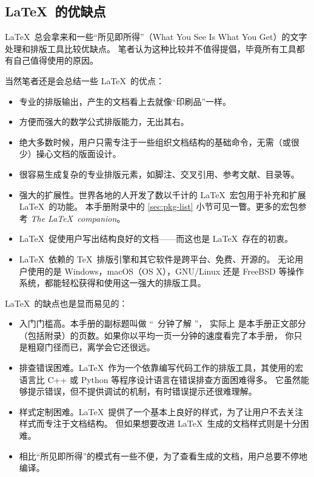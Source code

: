 \subsection{\LaTeX\ 的优缺点}\label{subec:advs}

\LaTeX\ 总会拿来和一些“所见即所得”（What You See Is What You Get）的文字处理和排版工具比较优缺点。
笔者认为这种比较并不值得提倡，毕竟所有工具都有自己值得使用的原因。

当然笔者还是会总结一些 \LaTeX\ 的优点：

\begin{itemize}
  \item 专业的排版输出，产生的文档看上去就像“印刷品”一样。

  \item 方便而强大的数学公式排版能力，无出其右。

  \item 绝大多数时候，用户只需专注于一些组织文档结构的基础命令，无需（或很少）操心文档的版面设计。

  \item 很容易生成复杂的专业排版元素，如脚注、交叉引用、参考文献、目录等。

  \item 强大的扩展性。世界各地的人开发了数以千计的 \LaTeX\ 宏包用于补充和扩展 \LaTeX\ 的功能。
  本手册附录中的 \ref{sec:pkg-list} 小节可见一瞥。更多的宏包参考 \textit{The \LaTeX\ companion}\cite{companion}。

  \item \LaTeX\ 促使用户写出结构良好的文档——而这也是 \LaTeX\ 存在的初衷。

  \item \LaTeX\ 依赖的 \TeX\ 排版引擎和其它软件是跨平台、免费、开源的。
  无论用户使用的是 Windows，macOS（OS X），GNU/Linux 还是 FreeBSD 等操作系统，都能轻松获得和使用这一强大的排版工具。
\end{itemize}

\LaTeX\ 的缺点也是显而易见的：
\begin{itemize}
  \item 入门门槛高。本手册的副标题叫做 “\pageref{lshort-minutes}~分钟了解 \LaTeXe ”，
  实际上 \pageref{lshort-minutes} 是本手册正文部分（包括附录）的页数。如果你以平均一页一分钟的速度看完了本手册，
  你只是粗窥门径而已，离学会它还很远。

  \item 排查错误困难。\LaTeX\ 作为一个依靠编写代码工作的排版工具，其使用的宏语言比 C++ 或 Python 等程序设计语言在错误排查方面困难得多。
  它虽然能够提示错误，但不提供调试的机制，有时错误提示还很难理解。

  \item 样式定制困难。\LaTeX\ 提供了一个基本上良好的样式，为了让用户不去关注样式而专注于文档结构。
  但如果想要改进 \LaTeX\ 生成的文档样式则是十分困难。

  \item 相比“所见即所得”的模式有一些不便，为了查看生成的文档，用户总要不停地编译。
\end{itemize}

